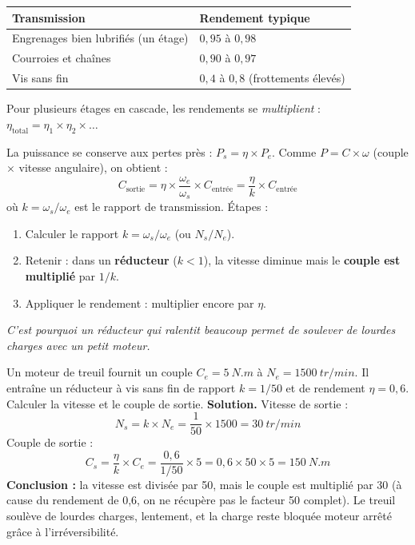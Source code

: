 \documentclass[11pt]{article}
\begin{document}
\begin{aretenir}
\begin{center}
\begin{tabularx}{\linewidth}{|l|X|}\hline
\rowcolor{popblueL} \textbf{Transmission} & \textbf{Rendement typique} \\ \hline
Engrenages bien lubrifiés (un étage) & $0{,}95$ à $0{,}98$ \\ \hline
Courroies et chaînes & $0{,}90$ à $0{,}97$ \\ \hline
Vis sans fin & $0{,}4$ à $0{,}8$ (frottements élevés) \\ \hline
\end{tabularx}
\end{center}
Pour plusieurs étages en cascade, les rendements se \emph{multiplient} : $\eta_{\text{total}} = \eta_1 \times \eta_2 \times \dots$
\end{aretenir}

\begin{methode}
La puissance se conserve aux pertes près : $P_s = \eta \times P_e$. Comme $P = C \times \omega$ (couple $\times$ vitesse angulaire), on obtient :
\[ C_{\text{sortie}} = \eta \times \frac{\omega_e}{\omega_s} \times C_{\text{entrée}} = \frac{\eta}{k} \times C_{\text{entrée}} \]
où $k = \omega_s/\omega_e$ est le rapport de transmission. Étapes :
\begin{enumerate}
\item Calculer le rapport $k = \omega_s/\omega_e$ (ou $N_s/N_e$).
\item Retenir : dans un \textbf{réducteur} ($k < 1$), la vitesse diminue mais le \textbf{couple est multiplié} par $1/k$.
\item Appliquer le rendement : multiplier encore par $\eta$.
\end{enumerate}
\emph{C'est pourquoi un réducteur qui ralentit beaucoup permet de soulever de lourdes charges avec un petit moteur.}
\end{methode}

\begin{exoresolu}
Un moteur de treuil fournit un couple $C_e = \SI{5}{N.m}$ à $N_e = \SI{1500}{tr/min}$. Il entraîne un réducteur à vis sans fin de rapport $k = 1/50$ et de rendement $\eta = 0{,}6$. Calculer la vitesse et le couple de sortie.
\tcblower
\textbf{Solution.} Vitesse de sortie :
\[ N_s = k \times N_e = \frac{1}{50} \times 1500 = \SI{30}{tr/min} \]
Couple de sortie :
\[ C_s = \frac{\eta}{k} \times C_e = \frac{0{,}6}{1/50} \times 5 = 0{,}6 \times 50 \times 5 = \SI{150}{N.m} \]
\textbf{Conclusion :} la vitesse est divisée par 50, mais le couple est multiplié par 30 (à cause du rendement de 0,6, on ne récupère pas le facteur 50 complet). Le treuil soulève de lourdes charges, lentement, et la charge reste bloquée moteur arrêté grâce à l'irréversibilité.
\end{exoresolu}
\end{document}
